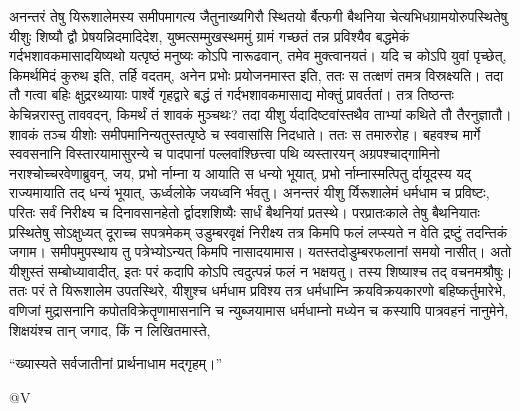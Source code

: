 \adhyAya
{}
\vakya अनन्तरं तेषु यिरूशालेमस्य समीपमागत्य जैतुनाख्यगिरौ स्थितयो र्बैत्फगी बैथनिया चेत्यभिधग्रामयोरुपस्थितेषु यीशुः शिष्यौ द्वौ प्रेषयन्निदमादिदेश,
\vakya युष्मत्सम्मुखस्थममुं ग्रामं गच्छतं तन्न प्रविश्यैव बद्धमेकं गर्दभशावकमासादयिष्यथो यत्पृष्ठं मनुष्यः कोऽपि नारूढवान्, तमेव मुक्त्वानयतं।
\vakya यदि च कोऽपि युवां पृच्छेत्, किमर्थमिदं कुरुथ इति, तर्हि वदतम्, अनेन प्रभोः प्रयोजनमास्त इति, ततः स तत्क्षणं तमत्र विस्रक्ष्यति।
\vakya तदा तौ गत्वा बहिः क्षुद्ररथ्यायाः पार्श्वे गृहद्वारे बद्धं तं गर्दभशावकमासाद्य मोक्तुं प्रावर्ततां।
\vakya तत्र तिष्ठन्तः केचिन्नरास्तु ताववदन्, किमर्थं तं शावकं मुञ्चथः?
\vakya तदा यीशु र्यदादिष्टवांस्तथैव ताभ्यां कथिते तौ तैरनुज्ञातौ।
\vakya शावकं तञ्च यीशोः समीपमानिन्यतुस्तत्पृष्ठे च स्ववासांसि निदधाते। ततः स तमारुरोह।
\vakya बहवश्च मार्गे स्ववसनानि विस्तारयामासुरन्ये च पादपानां पल्लवांश्छित्त्वा पथि व्यस्तारयन्
\vakya अग्रपश्चाद्गामिनो नराश्चोच्चरवेणाब्रुवन्, जय, प्रभो र्नाम्ना य आयाति स धन्यो भूयात्,
\vakya प्रभो र्नाम्नास्मत्पितु र्दायूदस्य यद् राज्यमायाति तद् धन्यं भूयात्, ऊर्ध्वलोके जयध्वनि र्भवतु।
\vakya अनन्तरं यीशु र्यिरूशालेमं धर्मधाम च प्रविष्टः, परितः सर्वं निरीक्ष्य च दिनावसानहेतो र्द्वादशशिष्यैः सार्धं बैथनियां प्रतस्थे।
\vakya परप्रातःकाले तेषु बैथनियातः प्रस्थितेषु सोऽक्षुध्यत् दूराच्च सपत्रमेकम् उडुम्बरवृक्षं निरीक्ष्य तत्र किमपि फलं लप्स्यते न वेति द्रष्टुं तदन्तिकं जगाम।
\vakya समीपमुपस्थाय तु पत्रेभ्योऽन्यत् किमपि नासादयामास। यतस्तदोडुम्बरफलानां समयो नासीत्।
\vakya अतो यीशुस्तं सम्बोध्यावादीत्, इतः परं कदापि कोऽपि त्वदुत्पन्नं फलं न भक्षयतु। तस्य शिष्याश्च तद् वचनमश्रौषुः।
\vakya ततः परं ते यिरूशालेम उपतस्थिरे, यीशुश्च धर्मधाम प्रविश्य तत्र धर्मधाम्नि क्रयविक्रयकारणो बहिष्कर्तुमारेभे,
\vakya वणिजां मुद्रासनानि कपोतविक्रेतॄणामासनानि च न्युब्जयामास धर्मधाम्नो मध्येन च कस्यापि पात्रवहनं नानुमेने,
\vakya शिक्षयंश्च तान् जगाद, किं न लिखितमास्ते,
\begin{poem}
\startwithline “ख्यास्यते सर्वजातीनां प्रार्थनाधाम मद्गृहम्।”
\end{poem}
@V\eoc